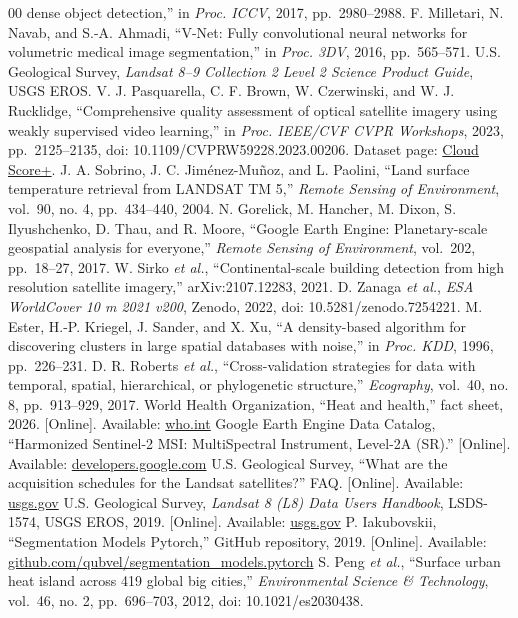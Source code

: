 \documentclass[conference]{IEEEtran}
\begin{document}
\begin{thebibliography}{00}
dense object detection,'' in \emph{Proc. ICCV}, 2017, pp.~2980--2988.
 F. Milletari, N. Navab, and S.-A. Ahmadi, ``V-Net: Fully convolutional
neural networks for volumetric medical image segmentation,'' in
\emph{Proc. 3DV}, 2016, pp.~565--571.
 U.S. Geological Survey, \emph{Landsat 8--9 Collection 2 Level 2 Science
Product Guide}, USGS EROS.
 V. J. Pasquarella, C. F. Brown, W. Czerwinski, and W. J. Rucklidge,
``Comprehensive quality assessment of optical satellite imagery using
weakly supervised video learning,'' in \emph{Proc. IEEE/CVF CVPR
Workshops}, 2023, pp.~2125--2135, doi: 10.1109/CVPRW59228.2023.00206.
Dataset page:
\href{https://developers.google.com/earth-engine/datasets/catalog/GOOGLE_CLOUD_SCORE_PLUS_V1_S2_HARMONIZED}{Cloud
Score+}.
 J. A. Sobrino, J. C. Jiménez-Muñoz, and L. Paolini, ``Land surface
temperature retrieval from LANDSAT TM 5,'' \emph{Remote Sensing of
Environment}, vol.~90, no. 4, pp.~434--440, 2004.
 N. Gorelick, M. Hancher, M. Dixon, S. Ilyushchenko, D. Thau, and R.
Moore, ``Google Earth Engine: Planetary-scale geospatial analysis for
everyone,'' \emph{Remote Sensing of Environment}, vol.~202, pp.~18--27,
2017.
 W. Sirko \emph{et al.}, ``Continental-scale building detection from high
resolution satellite imagery,'' arXiv:2107.12283, 2021.
 D. Zanaga \emph{et al.}, \emph{ESA WorldCover 10 m 2021 v200}, Zenodo,
2022, doi: 10.5281/zenodo.7254221.
 M. Ester, H.-P. Kriegel, J. Sander, and X. Xu, ``A density-based
algorithm for discovering clusters in large spatial databases with
noise,'' in \emph{Proc. KDD}, 1996, pp.~226--231.
 D. R. Roberts \emph{et al.}, ``Cross-validation strategies for data with
temporal, spatial, hierarchical, or phylogenetic structure,''
\emph{Ecography}, vol.~40, no. 8, pp.~913--929, 2017.
 World Health Organization, ``Heat and health,'' fact sheet, 2026.
{[}Online{]}. Available:
\href{https://www.who.int/news-room/fact-sheets/detail/climate-change-heat-and-health}{who.int}
 Google Earth Engine Data Catalog, ``Harmonized Sentinel-2 MSI:
MultiSpectral Instrument, Level-2A (SR).'' {[}Online{]}. Available:
\href{https://developers.google.com/earth-engine/datasets/catalog/COPERNICUS_S2_SR_HARMONIZED}{developers.google.com}
 U.S. Geological Survey, ``What are the acquisition schedules for the
Landsat satellites?'' FAQ. {[}Online{]}. Available:
\href{https://usgs.gov/faqs/what-are-acquisition-schedules-landsat-satellites}{usgs.gov}
 U.S. Geological Survey, \emph{Landsat 8 (L8) Data Users Handbook},
LSDS-1574, USGS EROS, 2019. {[}Online{]}. Available:
\href{https://www.usgs.gov/landsat-missions/landsat-8-data-users-handbook}{usgs.gov}
 P. Iakubovskii, ``Segmentation Models Pytorch,'' GitHub repository,
2019. {[}Online{]}. Available:
\href{https://github.com/qubvel/segmentation_models.pytorch}{github.com/qubvel/segmentation\_models.pytorch}
 S. Peng \emph{et al.}, ``Surface urban heat island across 419 global big
cities,'' \emph{Environmental Science \& Technology}, vol.~46, no. 2,
pp.~696--703, 2012, doi: 10.1021/es2030438.
\end{thebibliography}
\end{document}
